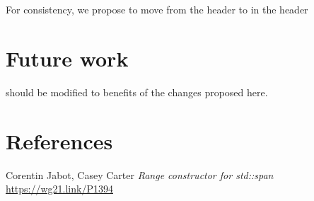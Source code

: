 \documentclass{wg21}
\begin{document}
\begin{addedblock}
\subsection{}

For consistency, 
we propose to move  from the header  \linebreak
to  in the header 


\end{addedblock}

\section{Future work}

 should be modified to benefits of the changes proposed here.

\section{References}
\renewcommand{\section}[2]{}%
\begin{thebibliography}{9}
	Corentin Jabot, Casey Carter
	\emph{Range constructor for std::span}\newline
	\url{https://wg21.link/P1394}
\end{thebibliography}
\end{document}
